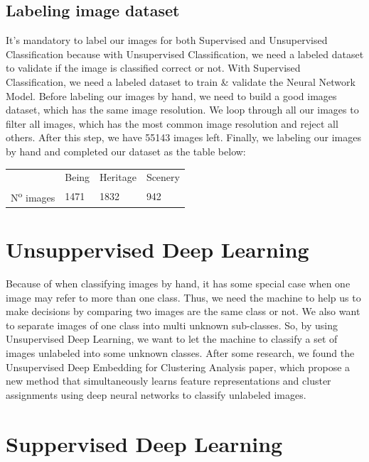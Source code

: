 \documentclass[hidelinks,12pt,a4paper]{report}
\renewcommand{\arraystretch}{2.5}
\begin{document}
\section{Labeling image dataset}
It's mandatory to label our images for both Supervised and Unsupervised Classification because with Unsupervised Classification, we need a labeled dataset to validate if the image is classified correct or not. With Supervised Classification, we need a labeled dataset to train \& validate the Neural Network Model.\newline\newline
Before labeling our images by hand, we need to build a good images dataset, which has the same image resolution. We loop through all our images to filter all images, which has the most common image resolution and reject all others. After this step, we have 55143 images left. \newline\newline
Finally, we labeling our images by hand and completed our dataset as the table below:\newline\newline
{\renewcommand{\arraystretch}{2}%
\noindent\begin{tabularx}{\textwidth}{YYYY}
  \toprule
& Being & Heritage & Scenery\\
N\textsuperscript{o} images & 1471 & 1832 & 942\\
  \bottomrule
\end{tabularx}} \quad

\chapter{Unsuppervised Deep Learning}

Because of when classifying images by hand, it has some special case when one image may refer to more than one class. Thus, we need the machine to help us to make decisions by comparing two images are the same class or not. We also want to separate images of one class into multi unknown sub-classes. So, by using Unsupervised Deep Learning, we want to let the machine to classify a set of images unlabeled into some unknown classes. \newline
After some research, we found the Unsupervised Deep Embedding for Clustering Analysis\cite{dec} paper, which propose a new method that simultaneously learns feature representations and cluster assignments using deep neural networks to classify unlabeled images. 

\chapter{Suppervised Deep Learning}



\end{document}
